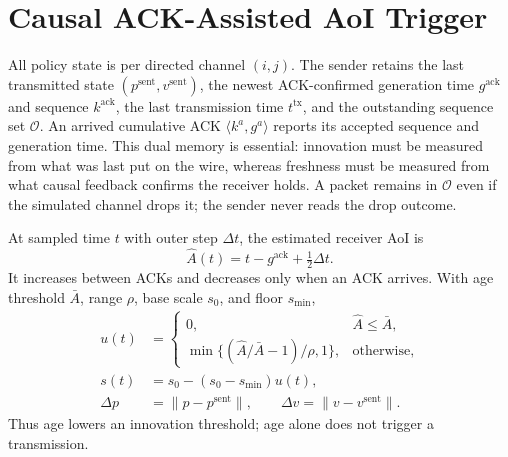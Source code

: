 \section{Causal ACK-Assisted AoI Trigger}
\label{sec:method}

All policy state is per directed channel $(i,j)$. The sender retains the
last transmitted state $(p^{\mathrm{sent}},v^{\mathrm{sent}})$, the newest
ACK-confirmed generation time $g^{\mathrm{ack}}$ and sequence
$k^{\mathrm{ack}}$, the last transmission time $t^{\mathrm{tx}}$, and the
outstanding sequence set $\mathcal O$. An arrived cumulative ACK
$\langle k^a,g^a\rangle$ reports its accepted sequence and generation time.
This dual memory is essential: innovation must be measured from what was
last put on the wire, whereas freshness must be measured from what causal
feedback confirms the receiver holds. A packet remains in $\mathcal O$ even
if the simulated channel drops it; the sender never reads the drop outcome.

At sampled time $t$ with outer step $\Delta t$, the estimated receiver AoI is
\begin{equation}
 \widehat A(t)=t-g^{\mathrm{ack}}+\tfrac12\Delta t .
 \label{eq:estaoi}
\end{equation}
It increases between ACKs and decreases only when an ACK arrives. With age
threshold $\bar A$, range $\rho$, base scale $s_0$, and floor $s_{\min}$,
\begin{align}
 u(t)&=\begin{cases}0,&\widehat A\leq\bar A,\\
 \min\{(\widehat A/\bar A-1)/\rho,1\},&\text{otherwise},\end{cases}
 \label{eq:excess}\\
 s(t)&=s_0-(s_0-s_{\min})u(t),\\
 \Delta p&=\|p-p^{\mathrm{sent}}\|,\qquad
 \Delta v=\|v-v^{\mathrm{sent}}\| .
 \label{eq:scale}
\end{align}
Thus age lowers an innovation threshold; age alone does not trigger a
transmission.

